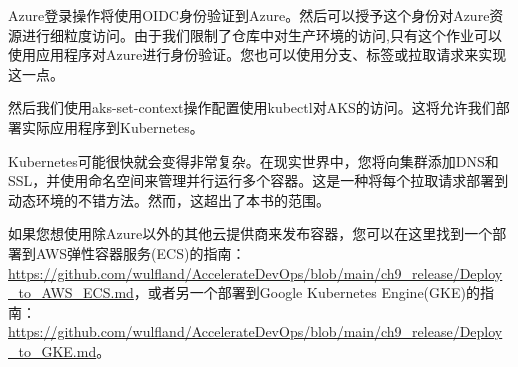 
Azure登录操作将使用OIDC身份验证到Azure。然后可以授予这个身份对Azure资源进行细粒度访问。由于我们限制了仓库中对生产环境的访问,只有这个作业可以使用应用程序对Azure进行身份验证。您也可以使用分支、标签或拉取请求来实现这一点。

然后我们使用aks-set-context操作配置使用kubectl对AKS的访问。这将允许我们部署实际应用程序到Kubernetes。


Kubernetes可能很快就会变得非常复杂。在现实世界中，您将向集群添加DNS和SSL，并使用命名空间来管理并行运行多个容器。这是一种将每个拉取请求部署到动态环境的不错方法。然而，这超出了本书的范围。

如果您想使用除Azure以外的其他云提供商来发布容器，您可以在这里找到一个部署到AWS弹性容器服务(ECS)的指南：\url{https://github.com/wulfland/AccelerateDevOps/blob/main/ch9_release/Deploy_to_AWS_ECS.md}，或者另一个部署到Google Kubernetes Engine(GKE)的指南：\url{https://github.com/wulfland/AccelerateDevOps/blob/main/ch9_release/Deploy_to_GKE.md}。